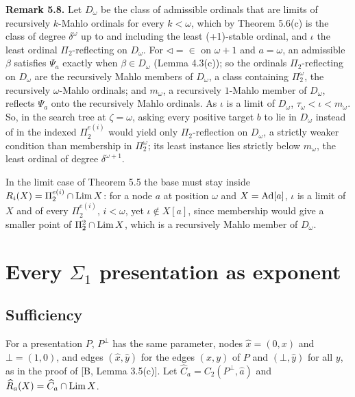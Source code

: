 \documentclass[11pt]{article}
\begin{document}
\textbf{Remark 5.8.} Let $D_\omega$ be the class of admissible ordinals that are limits of recursively $k$-Mahlo ordinals for
every $k < \omega$, which by Theorem
5.6(c) is the class of degree $\delta^\omega$ up to and including the least (+1)-stable ordinal, and $\iota$ the least ordinal $\Pi_2$-reflecting on
$D_\omega$. For $\lhd = {\in}$ on $\omega+1$ and $a = \omega$, an admissible $\beta$ satisfies $\Psi_a$ exactly when
$\beta \in D_\omega$ (Lemma 4.3(c)); so the ordinals $\Pi_2$-reflecting on $D_\omega$ are the recursively Mahlo members of $D_\omega$, a class containing $\Pi_2^{\omega}$, the recursively $\omega$-Mahlo
ordinals; and $m_\omega$, a recursively $1$-Mahlo member of $D_\omega$, reflects $\Psi_a$ onto the recursively Mahlo
ordinals. As $\iota$ is a limit of $D_\omega$, $\tau_\omega < \iota < m_\omega$. So, in the search tree at $\zeta =
\omega$, asking every positive target $b$ to lie in $D_\omega$ instead of in the indexed $\Pi_2^{e(i)}$ would yield only $\Pi_2$-reflection on
$D_\omega$, a strictly weaker condition than membership in $\Pi_2^{\omega}$; its least instance lies strictly below
$m_\omega$, the least ordinal of degree $\delta^{\omega+1}$.

In the limit case of Theorem 5.5 the base must stay inside $R_i(X) = \Pi_2^{e(i)} \cap \mathrm{Lim}\, X$: for a node $a$ at position
$\omega$ and $X = \mathrm{Ad}[a]$, $\iota$ is a limit of $X$ and of every $\Pi_2^{e(i)}$, $i < \omega$, yet $\iota \notin X[a]$, since
membership would give a smaller point of $\Pi_2^2 \cap \mathrm{Lim}\, X$, which is a recursively Mahlo member of $D_\omega$.

\section{\texorpdfstring{Every $\Sigma_1$ presentation as exponent}{Every Sigma\_1 presentation as exponent}}

\subsection{Sufficiency}

\begin{statement} For a presentation $P$, $P^\bot$ has the same parameter, nodes $\hat x = (0,x)$
and $\bot = (1,0)$, and edges $(\hat x, \hat y)$ for the edges $(x,y)$ of $P$ and $(\bot, \hat y)$ for all $y$, as in the
proof of [B, Lemma 3.5(c)]. Let $\widehat C_a = C_2(P^\bot, \hat a)$ and $\widehat R_a(X) = \widehat C_a \cap \mathrm{Lim}\, X$.
\end{statement}
\end{document}
